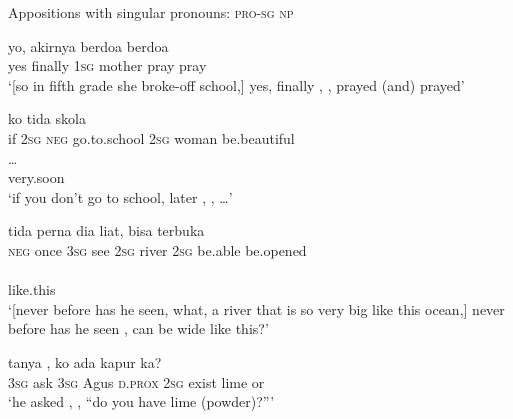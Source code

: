 \begin{styleExampleTitle}
Appositions with singular pronouns: \textsc{pro-sg} \textsc{np}
\end{styleExampleTitle}

\ea
\label{Example_6.39}
\gll {\ldots} {yo,} {akirnya} {} {} \textup{\textbar} {} {} {berdoa} {berdoa}\\ %
 { }  yes  finally  \textsc{1sg}  {} {} {}  mother  pray  pray\\

\glt
‘[so in fifth grade she broke-off school,] yes, finally , , prayed (and) prayed’ \textstyleExampleSource{[081011-023-Cv.0178]}
\z

\ea
\label{Example_6.40}
 {{ko}} {tida} {skola} {} {} {}\\ %
 if  {\textsc{2sg}}  \textsc{neg}  go.to.school  \textsc{2sg}  woman  be.beautiful\\
   {\ldots}\\
 {very.soon}  {}\\

\glt
‘if you don’t go to school, later , , {\ldots}’ \textstyleExampleSource{[081110-008-CvNP.0043]}
\z

\ea
\label{Example_6.41}
\gll {\ldots} {tida} {perna} {dia} {liat,} {} {} {} {bisa} {terbuka}\\ %
  { } \textsc{neg}  once  \textsc{3sg}  see  \textsc{2sg}  river  \textsc{2sg}  be.able  be.opened\\
\\
 {like.this}\\
 ‘[never before has he seen, what, a river that is so very big like this ocean,] never before has he seen ,  can be wide like this?’ \textstyleExampleSource{[080922-010a-CvNF.0212-0213]}
\z

\ea
\label{Example_6.42}
 {tanya} {} {} \textup{\textbar} {} {} {,} {ko} {ada} {kapur} {ka}?\\ %
 \textsc{3sg}  ask  \textsc{3sg} {} {} {} Agus  \textsc{d.prox}  \textsc{2sg}  exist  lime  or\\

\glt
‘he asked , , ``do you have lime (powder)?''' \textstyleExampleSource{[080922-010a-CvNF.0034]}
\z

